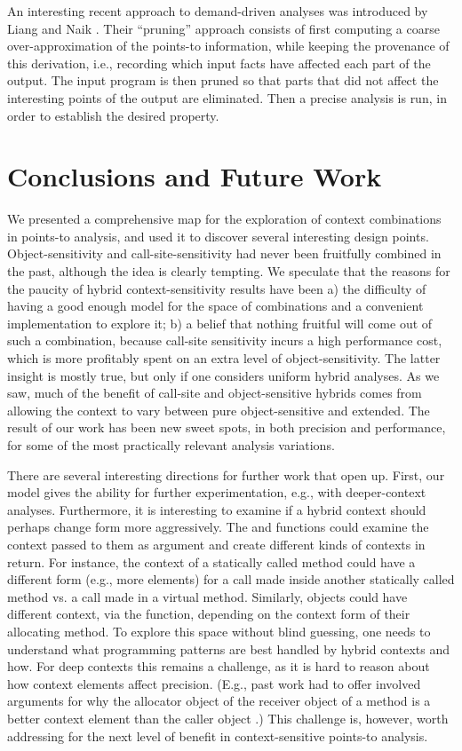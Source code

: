 An interesting recent approach to demand-driven analyses was
introduced by Liang and Naik \cite{Liang:2011:SAR:1993498.1993567}.
Their ``pruning'' approach consists of first computing a coarse
over-approximation of the points-to information, while keeping the
provenance of this derivation, i.e., recording which input facts have
affected each part of the output. The input program is then pruned so
that parts that did not affect the interesting points of the output
are eliminated. Then a precise analysis is run, in order to establish
the desired property.

\section{Conclusions and Future Work}

We presented a comprehensive map for the exploration of context
combinations in points-to analysis, and used it to discover several
interesting design points. Object-sensitivity and
call-site-sensitivity had never been fruitfully combined in the past,
although the idea is clearly tempting. We speculate that the reasons
for the paucity of hybrid context-sensitivity results have been a) the
difficulty of having a good enough model for the space of combinations
and a convenient implementation to explore it; b) a belief that
nothing fruitful will come out of such a combination, because
call-site sensitivity incurs a high performance cost, which is more
profitably spent on an extra level of object-sensitivity. The latter
insight is mostly true, but only if one considers uniform hybrid
analyses. As we saw, much of the benefit of call-site and
object-sensitive hybrids comes from allowing the context to vary
between pure object-sensitive and extended. The result of our work has
been new sweet spots, in both precision and performance, for some of
the most practically relevant analysis variations.

There are several interesting directions for further work that open
up. First, our model gives the ability for further experimentation,
e.g., with deeper-context analyses. Furthermore, it is interesting to
examine if a hybrid context should perhaps change form more
aggressively. The  and 
functions could examine the context passed to them as argument and
create different kinds of contexts in return. For instance, the
context of a statically called method could have a different form
(e.g., more elements) for a call made inside another statically called
method vs. a call made in a virtual method. Similarly, objects could
have different context, via the  function, depending
on the context form of their allocating method. To explore this space
without blind guessing, one needs to understand what programming
patterns are best handled by hybrid contexts and how. For deep
contexts this remains a challenge, as it is hard to reason about how
context elements affect precision. (E.g., past work had to offer
involved arguments for why the allocator object of the receiver object
of a method is a better context element than the caller object 
\cite{pointsto-popl11}.) This challenge is, however, worth addressing
for the next level of benefit in context-sensitive points-to analysis.